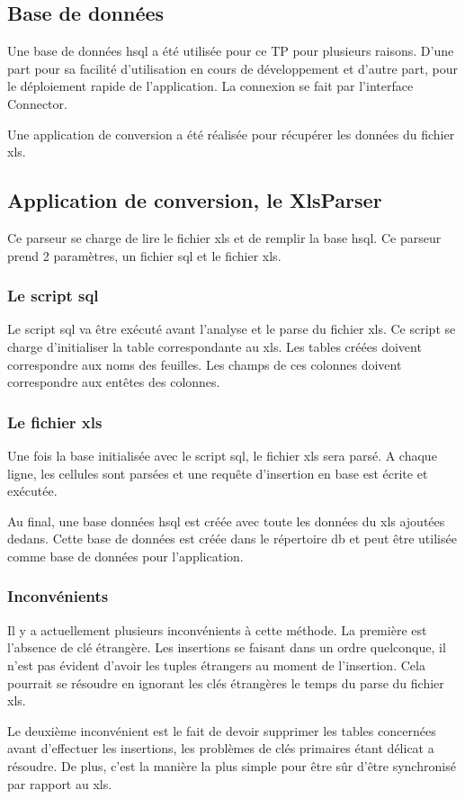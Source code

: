 \subsection{Base de données}
Une base de données hsql a été utilisée pour ce TP pour plusieurs raisons. D'une part pour sa facilité d'utilisation en cours de développement et d'autre part, pour le déploiement rapide de l'application. La connexion se fait par l'interface Connector.

Une application de conversion a été réalisée pour récupérer les données du fichier xls.
\subsection{Application de conversion, le XlsParser}
Ce parseur se charge de lire le fichier xls et de remplir la base hsql. Ce parseur prend 2 paramètres, un fichier sql et le fichier xls.
\subsubsection{Le script sql}
Le script sql va être exécuté avant l'analyse et le parse du fichier xls. Ce script se charge d'initialiser la table correspondante au xls. Les tables créées doivent correspondre aux noms des feuilles. Les champs de ces colonnes doivent correspondre aux entêtes des colonnes.
\subsubsection{Le fichier xls}
Une fois la base initialisée avec le script sql, le fichier xls sera parsé. A chaque ligne, les cellules sont parsées et une requête d'insertion en base est écrite et exécutée.

Au final, une base données hsql est créée avec toute les données du xls ajoutées dedans. Cette base de données est créée dans le répertoire db et peut être utilisée comme base de données pour l'application.
\subsubsection{Inconvénients}
Il y a actuellement plusieurs inconvénients à cette méthode. La première est l'absence de clé étrangère. Les insertions se faisant dans un ordre quelconque, il n'est pas évident d'avoir les tuples étrangers au moment de l'insertion. Cela pourrait se résoudre en ignorant les clés étrangères le temps du parse du fichier xls.

Le deuxième inconvénient est le fait de devoir supprimer les tables concernées avant d'effectuer les insertions, les problèmes de clés primaires étant délicat a résoudre. De plus, c'est la manière la plus simple pour être sûr d'être synchronisé par rapport au xls.
